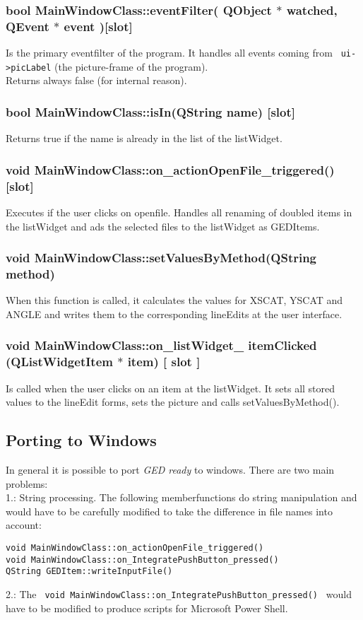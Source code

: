 \subsubsection{bool MainWindowClass::eventFilter( QObject $\ast$ watched, QEvent  $\ast$ event )[slot]}
Is the primary eventfilter of the program. It handles all events coming from \lstinline$ ui->picLabel$ (the picture-frame of the program). \\
Returns always false (for internal reason). 

\subsubsection{bool MainWindowClass::isIn(QString name)  [slot]  } 
Returns true if the name is already in the list of the listWidget. 

\subsubsection{ void MainWindowClass::on\_actionOpenFile\_triggered()  [slot] }
Executes if the user clicks on openfile. Handles all renaming of doubled items in the listWidget and ads the selected files to the listWidget as GEDItems. 

\subsubsection{void MainWindowClass::setValuesByMethod(QString method) }
When this function is called, it calculates the values for XSCAT, YSCAT and ANGLE and writes them to the corresponding lineEdits at the user interface.  

\subsubsection{void MainWindowClass::on\_listWidget\_ itemClicked (QListWidgetItem  $\ast$ item) [ slot ] }
Is called when the user clicks on an item at the listWidget. It sets all stored values to the lineEdit forms, sets the picture and calls  setValuesByMethod(). 

\subsection{Porting to Windows} 
In general it is possible to port \textit{GED ready} to windows. There are two main problems: \\
1.: String processing. The following memberfunctions do string manipulation and would have to be carefully modified to take the difference in file names into account: 
\begin{lstlisting}
void MainWindowClass::on_actionOpenFile_triggered()
void MainWindowClass::on_IntegratePushButton_pressed()
QString GEDItem::writeInputFile() 
\end{lstlisting}
2.: The \lstinline! void MainWindowClass::on_IntegratePushButton_pressed() ! would have to be modified to produce scripts for Microsoft Power Shell. 


